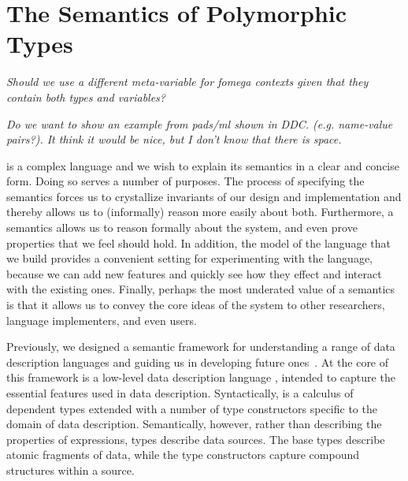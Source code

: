 \section{The Semantics of Polymorphic Types}
\label{sec:ddc}
{\em Should we use a different meta-variable for fomega contexts given
  that they contain both types and variables?}

\emph{Do we want to show an example from pads/ml shown in DDC.
  (e.g. name-value pairs?). It think it would be nice, but I don't
  know that there is space.  }


\padsml{} is a complex language and we wish to explain its semantics
in a clear and concise form. Doing so serves a number of purposes. The
process of specifying the semantics forces us to crystallize
invariants of our design and implementation and thereby allows us to
(informally) reason more easily about both. Furthermore, a semantics
allows us to reason formally about the system, and even prove
properties that we feel should hold. In addition, the model of the
language that we build provides a convenient setting for experimenting
with the language, because we can add new features and quickly see how
they effect and interact with the existing ones. Finally, perhaps the
most underated value of a semantics is that it allows us to convey the
core ideas of the system to other researchers, language implementers,
and even users.

Previously, we designed a semantic framework for understanding a range
of data description languages and guiding us in developing future
ones~\cite{fisher+:next700ddl}. At the core of this framework is a
low-level data description language \ddcold{}, intended to capture the
essential features used in data description.  Syntactically, \ddcold{}
is a calculus of dependent types extended with a number of type
constructors specific to the domain of data description. Semantically,
however, rather than describing the properties of expressions,
\ddcold{} types describe data sources. The base types describe atomic
fragments of data, while the type constructors capture compound
structures within a source.

